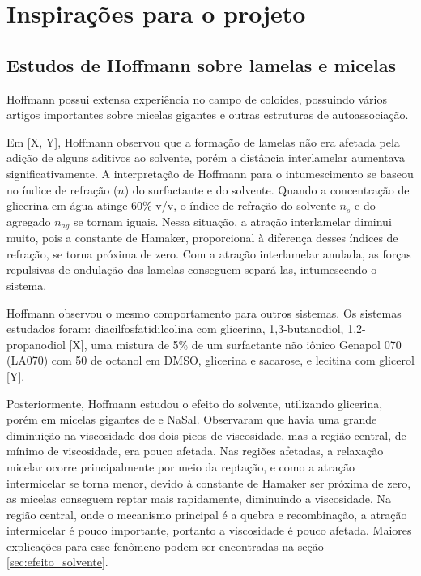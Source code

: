 	
	\chapter{Inspirações para o projeto}
		\section{Estudos de Hoffmann sobre lamelas e micelas}
		Hoffmann possui extensa experiência no campo de coloides, possuindo vários artigos importantes sobre micelas gigantes e outras estruturas de autoassociação.
		
		Em [X, Y], Hoffmann observou que a formação de lamelas não era afetada pela adição de alguns aditivos ao solvente, porém a distância interlamelar aumentava significativamente. A interpretação de Hoffmann para o intumescimento se baseou no índice de refração (\(n\)) do surfactante e do solvente. Quando a concentração de glicerina em água atinge 60\% v/v, o índice de refração do solvente \(n_s\) e do agregado \(n_{ag}\) se tornam iguais. Nessa situação, a atração interlamelar diminui muito, pois a constante de Hamaker, proporcional à diferença desses índices de refração, se torna próxima de zero. Com a atração interlamelar anulada, as forças repulsivas de ondulação das lamelas conseguem separá-las, intumescendo o sistema.
		
		Hoffmann observou o mesmo comportamento para outros sistemas. Os sistemas estudados foram: diacilfosfatidilcolina com glicerina, 1,3-butanodiol, 1,2-propanodiol [X], uma mistura de 5\% de um surfactante não iônico Genapol 070 (LA070) com 50\mM{} de octanol em DMSO, glicerina e sacarose, e lecitina com glicerol [Y].
		
		
		
		Posteriormente, Hoffmann estudou o efeito do solvente, utilizando glicerina, porém em micelas gigantes de \CTAB{} e NaSal. Observaram que havia uma grande diminuição na viscosidade dos dois picos de viscosidade, mas a região central, de mínimo de viscosidade, era pouco afetada. Nas regiões afetadas, a relaxação micelar ocorre principalmente por meio da reptação, e como a atração intermicelar se torna menor, devido à constante de Hamaker ser próxima de zero, as micelas conseguem reptar mais rapidamente, diminuindo a viscosidade. Na região central, onde o mecanismo principal é a quebra e recombinação, a atração intermicelar é pouco importante, portanto a viscosidade é pouco afetada. Maiores explicações para esse fenômeno podem ser encontradas na seção \ref{sec:efeito_solvente}.
		
